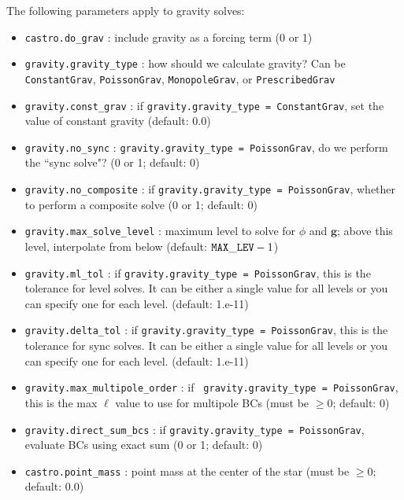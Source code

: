 The following parameters apply to gravity
solves:
\begin{itemize}

\item {\tt castro.do\_grav} : include gravity as a forcing term (0 or 1)

\item {\tt gravity.gravity\_type} : how should we calculate gravity?
  Can be {\tt ConstantGrav}, {\tt PoissonGrav}, {\tt MonopoleGrav}, or {\tt PrescribedGrav}

\item {\tt gravity.const\_grav} : if {\tt gravity.gravity\_type =
  ConstantGrav}, set the value of constant gravity (default: 0.0)

\item {\tt gravity.no\_sync} : {\tt gravity.gravity\_type = PoissonGrav},
 do we perform the ``sync solve"? (0 or 1; default: 0)

\item {\tt gravity.no\_composite} : if {\tt gravity.gravity\_type =
  PoissonGrav}, whether to perform a composite solve (0 or 1; default:
  0)

\item {\tt gravity.max\_solve\_level} : maximum level to solve for
  $\phi$ and $\mathbf{g}$; above this level, interpolate from below
  (default: ${\tt MAX\_LEV} - 1$)

\item {\tt gravity.ml\_tol} : if {\tt gravity.gravity\_type =
  PoissonGrav}, this is the tolerance for level solves.  It can be
  either a single value for all levels or you can specify one for each
  level. (default: 1.e-11)

\item {\tt gravity.delta\_tol} : if {\tt gravity.gravity\_type =
  PoissonGrav}, this is the tolerance for sync solves. It can be
  either a single value for all levels or you can specify one for each
  level.  (default: 1.e-11)

\item {\tt gravity.max\_multipole\_order} : if {\tt
  gravity.gravity\_type = PoissonGrav}, this is the max $\ell$ value
  to use for multipole BCs (must be $\geq 0$; default: 0)

\item {\tt gravity.direct\_sum\_bcs} : if {\tt gravity.gravity\_type =
  PoissonGrav}, evaluate BCs using exact sum (0 or 1; default: 0)

\item {\tt castro.point\_mass} : point mass at the center of the
 star (must be $\geq 0$; default: 0.0)
\end{itemize}

